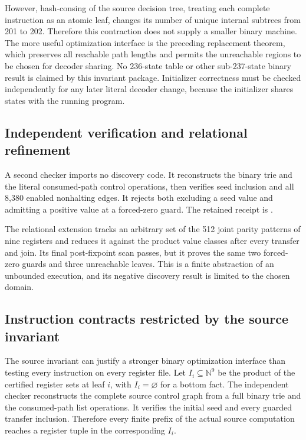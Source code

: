 However, hash-consing of the source decision tree, treating each complete
instruction as an atomic leaf, changes its number of unique internal subtrees
from 201 to 202.  Therefore this contraction does not
supply a smaller binary machine.  The more useful optimization interface is
the preceding replacement theorem, which preserves all reachable path lengths
and permits the unreachable regions to be chosen for decoder sharing.  No
236-state table or other sub-237-state binary result is claimed by this
invariant package.  Initializer correctness must be checked independently for
any later literal decoder change, because the initializer shares states with
the running program.

\subsection{Independent verification and relational refinement}

A second checker imports no discovery code. It reconstructs the binary trie and the literal consumed-path control operations, then verifies seed inclusion and all 8,380 enabled nonhalting edges. It rejects both excluding a seed value and admitting a positive value at a forced-zero guard. The retained receipt is .

The relational extension tracks an arbitrary set of the 512 joint parity patterns of nine registers and reduces it against the product value classes after every transfer and join. Its final post-fixpoint scan passes, but it proves the same two forced-zero guards and three unreachable leaves. This is a finite abstraction of an unbounded execution, and its negative discovery result is limited to the chosen domain.

\subsection{Instruction contracts restricted by the source invariant}

The source invariant can justify a stronger binary optimization interface than
testing every instruction on every register file.  Let $I_i\subseteq\mathbb N^9$
be the product of the certified register sets at leaf $i$, with $I_i=\varnothing$
for a bottom fact.  The independent checker reconstructs the complete source
control graph from a full binary trie and the consumed-path list operations.
It verifies the initial seed and every guarded transfer inclusion.  Therefore
every finite prefix of the actual source computation reaches a register tuple
in the corresponding $I_i$.

